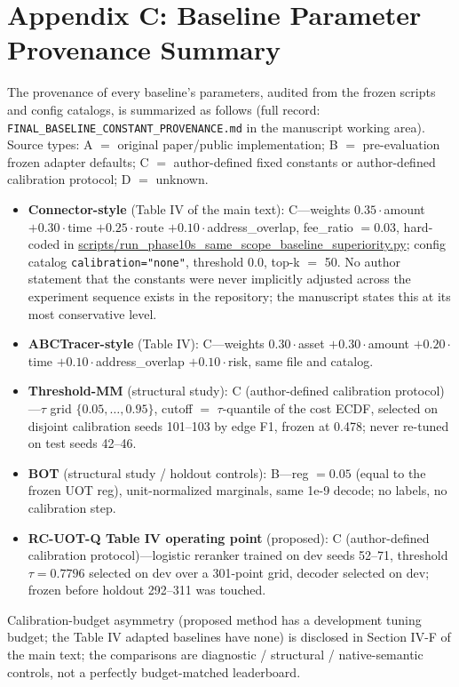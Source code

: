 \documentclass[journal]{IEEEtran}
\begin{document}
\section*{Appendix C: Baseline Parameter Provenance Summary}

The provenance of every baseline's parameters, audited from the frozen scripts and config catalogs, is summarized as follows (full record: \texttt{FINAL\_BASELINE\_CONSTANT\_PROVENANCE.md} in the manuscript working area). Source types: A $=$ original paper/public implementation; B $=$ pre-evaluation frozen adapter defaults; C $=$ author-defined fixed constants or author-defined calibration protocol; D $=$ unknown.

\begin{itemize}
\item \textbf{Connector-style} (Table IV of the main text): C---weights $0.35\cdot$amount $+ 0.30\cdot$time $+ 0.25\cdot$route $+ 0.10\cdot$address\_overlap, fee\_ratio $= 0.03$, hard-coded in \url{scripts/run_phase10s_same_scope_baseline_superiority.py}; config catalog \texttt{calibration="none"}, threshold 0.0, top-k $=$ 50. No author statement that the constants were never implicitly adjusted across the experiment sequence exists in the repository; the manuscript states this at its most conservative level.
\item \textbf{ABCTracer-style} (Table IV): C---weights $0.30\cdot$asset $+ 0.30\cdot$amount $+ 0.20\cdot$time $+ 0.10\cdot$address\_overlap $+ 0.10\cdot$risk, same file and catalog.
\item \textbf{Threshold-MM} (structural study): C (author-defined calibration protocol)---$\tau$ grid $\{0.05,\dots,0.95\}$, cutoff $=$ $\tau$-quantile of the cost ECDF, selected on disjoint calibration seeds 101--103 by edge F1, frozen at 0.478; never re-tuned on test seeds 42--46.
\item \textbf{BOT} (structural study / holdout controls): B---reg $= 0.05$ (equal to the frozen UOT reg), unit-normalized marginals, same 1e-9 decode; no labels, no calibration step.
\item \textbf{RC-UOT-Q Table IV operating point} (proposed): C (author-defined calibration protocol)---logistic reranker trained on dev seeds 52--71, threshold $\tau = 0.7796$ selected on dev over a 301-point grid, decoder selected on dev; frozen before holdout 292--311 was touched.
\end{itemize}

Calibration-budget asymmetry (proposed method has a development tuning budget; the Table IV adapted baselines have none) is disclosed in Section IV-F of the main text; the comparisons are diagnostic / structural / native-semantic controls, not a perfectly budget-matched leaderboard.
\end{document}
